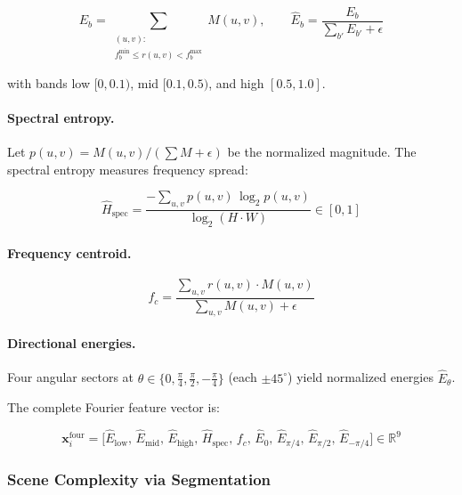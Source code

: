 \begin{equation}
    E_b = \sum_{\substack{(u,v):\\ f_b^{\min} \leq r(u,v) < f_b^{\max}}}
          \!\!M(u,v),
    \qquad
    \hat{E}_b = \frac{E_b}{\sum_{b'} E_{b'} + \epsilon}
\end{equation}

with bands low $[0, 0.1)$, mid $[0.1, 0.5)$, and high $[0.5, 1.0]$.

\paragraph{Spectral entropy.}
Let $p(u,v) = M(u,v) / (\sum M + \epsilon)$ be the normalized magnitude.  The
spectral entropy measures frequency spread:

\begin{equation}
    \hat{H}_{\text{spec}} =
    \frac{-\sum_{u,v} p(u,v)\,\log_2 p(u,v)}{\log_2(H \cdot W)}
    \in [0, 1]
\end{equation}

\paragraph{Frequency centroid.}

\begin{equation}
    f_c = \frac{\sum_{u,v} r(u,v) \cdot M(u,v)}
               {\sum_{u,v} M(u,v) + \epsilon}
\end{equation}

\paragraph{Directional energies.}
Four angular sectors at $\theta \in \{0, \frac{\pi}{4}, \frac{\pi}{2},
-\frac{\pi}{4}\}$ (each $\pm 45^{\circ}$) yield normalized energies
$\hat{E}_{\theta}$.

The complete Fourier feature vector is:

\begin{equation}
    \mathbf{x}_i^{\text{four}} =
    \bigl[\hat{E}_{\text{low}},\, \hat{E}_{\text{mid}},\, \hat{E}_{\text{high}},\,
          \hat{H}_{\text{spec}},\, f_c,\,
          \hat{E}_{0},\, \hat{E}_{\pi/4},\, \hat{E}_{\pi/2},\, \hat{E}_{-\pi/4}
    \bigr]
    \in \mathbb{R}^{9}
\end{equation}

\subsubsection{Scene Complexity via Segmentation}
\label{sec:sam}

